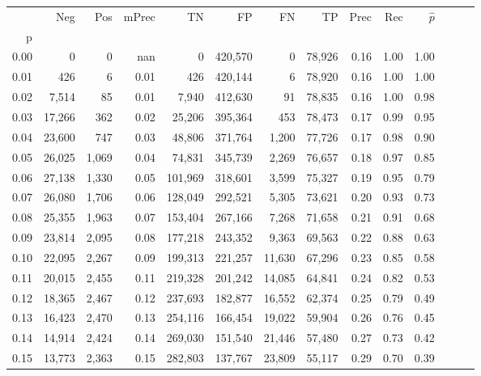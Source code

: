 \begin{tabular}{rrrrrrrrrrrrrr}
\toprule
{} &     Neg &    Pos & mPrec &       TN &       FP &      FN &      TP &  Prec &   Rec & $\hat{p}$ \\
p    &         &        &       &          &          &         &         &       &       &           \\
\midrule
0.00 &       0 &      0 &   nan &        0 &  420,570 &       0 &  78,926 &  0.16 &  1.00 &      1.00 \\
0.01 &     426 &      6 &  0.01 &      426 &  420,144 &       6 &  78,920 &  0.16 &  1.00 &      1.00 \\
0.02 &   7,514 &     85 &  0.01 &    7,940 &  412,630 &      91 &  78,835 &  0.16 &  1.00 &      0.98 \\
0.03 &  17,266 &    362 &  0.02 &   25,206 &  395,364 &     453 &  78,473 &  0.17 &  0.99 &      0.95 \\
0.04 &  23,600 &    747 &  0.03 &   48,806 &  371,764 &   1,200 &  77,726 &  0.17 &  0.98 &      0.90 \\
0.05 &  26,025 &  1,069 &  0.04 &   74,831 &  345,739 &   2,269 &  76,657 &  0.18 &  0.97 &      0.85 \\
0.06 &  27,138 &  1,330 &  0.05 &  101,969 &  318,601 &   3,599 &  75,327 &  0.19 &  0.95 &      0.79 \\
0.07 &  26,080 &  1,706 &  0.06 &  128,049 &  292,521 &   5,305 &  73,621 &  0.20 &  0.93 &      0.73 \\
0.08 &  25,355 &  1,963 &  0.07 &  153,404 &  267,166 &   7,268 &  71,658 &  0.21 &  0.91 &      0.68 \\
0.09 &  23,814 &  2,095 &  0.08 &  177,218 &  243,352 &   9,363 &  69,563 &  0.22 &  0.88 &      0.63 \\
0.10 &  22,095 &  2,267 &  0.09 &  199,313 &  221,257 &  11,630 &  67,296 &  0.23 &  0.85 &      0.58 \\
0.11 &  20,015 &  2,455 &  0.11 &  219,328 &  201,242 &  14,085 &  64,841 &  0.24 &  0.82 &      0.53 \\
0.12 &  18,365 &  2,467 &  0.12 &  237,693 &  182,877 &  16,552 &  62,374 &  0.25 &  0.79 &      0.49 \\
0.13 &  16,423 &  2,470 &  0.13 &  254,116 &  166,454 &  19,022 &  59,904 &  0.26 &  0.76 &      0.45 \\
0.14 &  14,914 &  2,424 &  0.14 &  269,030 &  151,540 &  21,446 &  57,480 &  0.27 &  0.73 &      0.42 \\
0.15 &  13,773 &  2,363 &  0.15 &  282,803 &  137,767 &  23,809 &  55,117 &  0.29 &  0.70 &      0.39 \\

\end{tabular}

